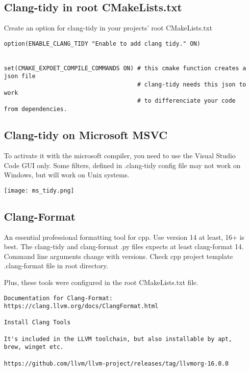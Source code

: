 \documentclass[openany]{report}
\begin{document}
\subsection{Clang-tidy in root CMakeLists.txt}

Create an option for clang-tidy in your projects' root CMakeLists.txt

\begin{verbatim}
option(ENABLE_CLANG_TIDY "Enable to add clang tidy." ON)


set(CMAKE_EXPOET_COMPILE_COMMANDS ON) # this cmake function creates a json file
                                      # clang-tidy needs this json to work
                                      # to differenciate your code from dependencies.

\end{verbatim}


\subsection{Clang-tidy on Microsoft MSVC}

To activate it with the microsoft compiler, you need to use the Visual Studio Code GUI only.
Some filters, defined in .clang-tidy config file may not work on Windows, but will work on Unix systems.

\begin{center}
    \texttt{[image: ms\_tidy.png]}
\end{center}

 
\subsection{Clang-Format}

An essential professional formatting tool for cpp. Use version 14 at least, 16+ is best. The 
clang-tidy and clang-format .py files expects at least clang-format 14. Command line arguments 
change with versions. Check cpp project template .clang-format file in root directory.

Plus, these tools were configured in the root CMakeLists.txt file.

\begin{verbatim}
Documentation for Clang-Format: https://clang.llvm.org/docs/ClangFormat.html

Install Clang Tools

It's included in the LLVM toolchain, but also installable by apt, brew, winget etc.

https://github.com/llvm/llvm-project/releases/tag/llvmorg-16.0.0
\end{verbatim}
\end{document}
